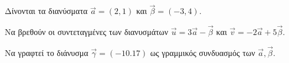Δίνονται τα διανύσματα $ \vec{a}=(2,1) $ και $ \vec{\beta}=(-3,4) $.
\begin{alist}
\item Να βρεθούν οι συντεταγμένες των διανυσμάτων $ \vec{u}=3\vec{a}-\vec{\beta} $ και $ \vec{v}=-2\vec{a}+5\vec{\beta} $.
\item Να γραφτεί το διάνυσμα $ \vec{\gamma}=(-10.17) $ ως γραμμικός συνδυασμός των $ \vec{a},\vec{\beta} $.
\end{alist}
